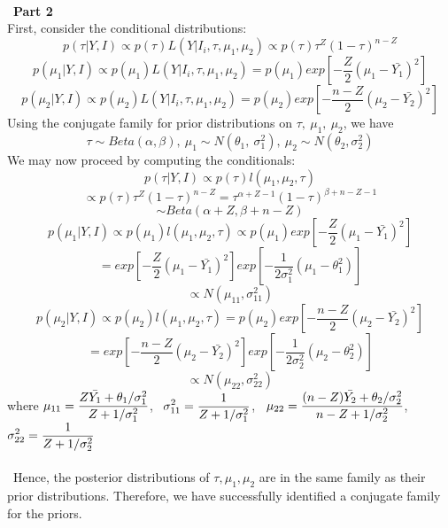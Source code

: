 \documentclass[10pt,a4paper]{article}
\begin{document}
\text{}
\\\
\textbf{Part 2}\\
First, consider the conditional distributions:\\
$$p(\tau|Y,I) \propto p(\tau)L(Y \vert I_i, \tau, \mu_1,\mu_2)\propto p(\tau) \tau^{Z}(1-\tau)^{n-Z}$$
$$p(\mu_{1}|Y,I)\propto p(\mu_{1})L(Y \vert I_i, \tau, \mu_1,\mu_2)
=p(\mu_{1})exp[-\frac{Z}{2}(\mu_{1}-\bar{Y_{1}})^2]$$
$$p(\mu_{2}|Y,I)\propto p(\mu_{2})L(Y \vert I_i, \tau, \mu_1,\mu_2)
=p(\mu_{2})exp[-\frac{n-Z}{2}(\mu_{2}-\bar{Y_{2}})^2]$$
Using the conjugate family for prior distributions on $\tau,\ \mu_{1},\ \mu_{2}$, we have
$$\tau \sim Beta(\alpha,\beta), \  \mu_{1} \sim N(\theta_{1}, \ \sigma_{1}^{2}),  \ \mu_{2} \sim  N(\theta_{2},\sigma_{2}^{2})$$ 
We may now proceed by computing the conditionals:
$$p(\tau|Y,I) \propto p(\tau)l(\mu_{1},\mu_{2},\tau)$$
$$\propto p(\tau) \tau^{Z}(1-\tau)^{n-Z}
=\tau^{\alpha+Z-1}(1-\tau)^{\beta+n-Z-1}$$
$$\sim Beta(\alpha+Z,\beta+n-Z)$$
$$p(\mu_{1}|Y,I) \propto p(\mu_{1})l(\mu_{1},\mu_{2},\tau)\propto p(\mu_{1})exp[-\frac{Z}{2}(\mu_{1}-\bar{Y_{1}})^2]$$
$$=exp[-\frac{Z}{2}(\mu_{1}-\bar{Y_{1}})^2] exp[-\frac{1}{2\sigma_{1}^{2}}(\mu_{1}-\theta_{1}^{2})]$$
$$\propto N(\mu_{11},\sigma_{11}^{2})$$
$$p(\mu_{2}|Y,I) \propto p(\mu_{2})l(\mu_{1},\mu_{2},\tau)=p(\mu_{2})exp[-\frac{n-Z}{2}(\mu_{2}-\bar{Y_{2}})^2]$$
$$=exp[-\frac{n-Z}{2}(\mu_{2}-\bar{Y_{2}})^2] exp[-\frac{1}{2\sigma_{2}^{2}}(\mu_{2}-\theta_{2}^{2})]$$
$$\propto N(\mu_{22},\sigma_{22}^{2})$$
where $\mathlarger{\mu_{11}=\frac{Z\bar{Y_{1}}+\theta_{1}/\sigma_{1}^{2}}{Z+1/\sigma_{1}^{2}}}$, \  $\mathlarger{\sigma_{11}^{2}=\frac{1}{Z+1/\sigma_{1}^{2}}}$, \ $\mathlarger{\mu_{22}=\frac{(n-Z)\bar{Y_{2}}+\theta_{2}/\sigma_{2}^{2}}{n-Z+1/\sigma_{2}^{2}}}$, \ $\mathlarger{\sigma_{22}^{2}=\frac{1}{Z+1/\sigma_{2}^{2}}}$\\
\\\
Hence, the posterior distributions of $\tau, \mu_{1}, \mu_{2}$ are in the same family as their prior distributions. Therefore, we have successfully identified a conjugate family for the priors. 
\end{document}
